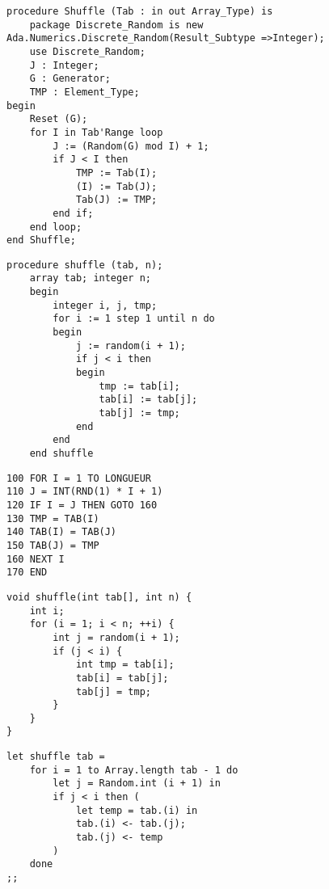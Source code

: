 \documentclass[a4paper,12pt]{book}
\begin{document}
\begin{encadre}
\begin{verbatim}
procedure Shuffle (Tab : in out Array_Type) is
    package Discrete_Random is new Ada.Numerics.Discrete_Random(Result_Subtype =>Integer);
    use Discrete_Random;
    J : Integer;
    G : Generator;
    TMP : Element_Type;
begin
    Reset (G);
    for I in Tab'Range loop
        J := (Random(G) mod I) + 1;
        if J < I then
            TMP := Tab(I);
            (I) := Tab(J);
            Tab(J) := TMP;
        end if;
    end loop;
end Shuffle;
\end{verbatim}
\end{encadre}

\begin{encadre}
\begin{verbatim}
procedure shuffle (tab, n);
    array tab; integer n;
    begin
        integer i, j, tmp;
        for i := 1 step 1 until n do
        begin
            j := random(i + 1);
            if j < i then
            begin
                tmp := tab[i];
                tab[i] := tab[j];
                tab[j] := tmp;
            end
        end
    end shuffle
\end{verbatim}
\end{encadre}

\begin{encadre}
\begin{verbatim}
100 FOR I = 1 TO LONGUEUR
110 J = INT(RND(1) * I + 1)
120 IF I = J THEN GOTO 160
130 TMP = TAB(I)
140 TAB(I) = TAB(J)
150 TAB(J) = TMP
160 NEXT I
170 END
\end{verbatim}
\end{encadre}


\begin{encadre}[code C]
\begin{verbatim}
void shuffle(int tab[], int n) {
    int i;
    for (i = 1; i < n; ++i) {
        int j = random(i + 1);
        if (j < i) {
            int tmp = tab[i];
            tab[i] = tab[j];
            tab[j] = tmp;
        }
    }
}
\end{verbatim}
\end{encadre}

\begin{encadre}[caml]
\begin{verbatim}
let shuffle tab =
    for i = 1 to Array.length tab - 1 do
        let j = Random.int (i + 1) in
        if j < i then (
            let temp = tab.(i) in
            tab.(i) <- tab.(j);
            tab.(j) <- temp
        )
    done
;;
\end{verbatim}
\end{encadre}
\end{document}
